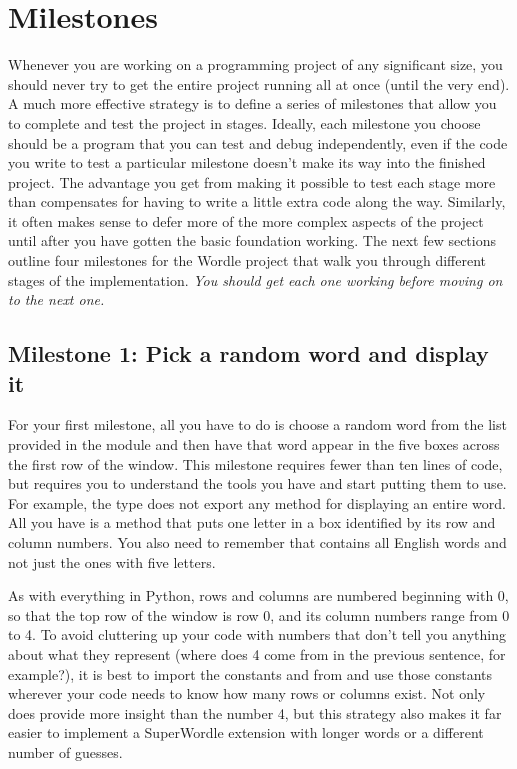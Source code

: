 \documentclass[letterpaper,12pt]{exam}
\begin{document}
\section{Milestones}
Whenever you are working on a programming project of any significant size, you should never try to get the entire project running all at once (until the very end). A much more effective strategy is to define a series of milestones that allow you to complete and test the project in stages. Ideally, each milestone you choose should be a program that you can test and debug independently, even if the code you write to test a particular milestone doesn't make its way into the finished project. The advantage you get from making it possible to test each stage more than compensates for having to write a little extra code along the way. Similarly, it often makes sense to defer more of the more complex aspects of the project until after you have gotten the basic foundation working. The next few sections outline four milestones for the Wordle project that walk you through different stages of the implementation. \emph{You should get each one working before moving on to the next one.}

\subsection{Milestone 1: Pick a random word and display it}
For your first milestone, all you have to do is choose a random word from the list provided in the  module and then have that word appear in the five boxes across the first row of the window. This milestone requires fewer than ten lines of code, but requires you to understand the tools you have and start putting them to use. For example, the  type does not export any method for displaying an entire word. All you have is a method  that puts one letter in a box identified by its row and column numbers. You also need to remember that  contains all English words and not just the ones with five letters.

As with everything in Python, rows and columns are numbered beginning with 0, so that the top row of the window is row 0, and its column numbers range from 0 to 4. To avoid cluttering up your code with numbers that don't tell you anything about what they represent (where does 4 come from in the previous sentence, for example?), it is best to import the constants  and  from  and use those constants wherever your code needs to know how many rows or columns exist. Not only does  provide more insight than the number 4, but this strategy also makes it far easier to implement a SuperWordle extension with longer words or a different number of guesses.
\end{document}

